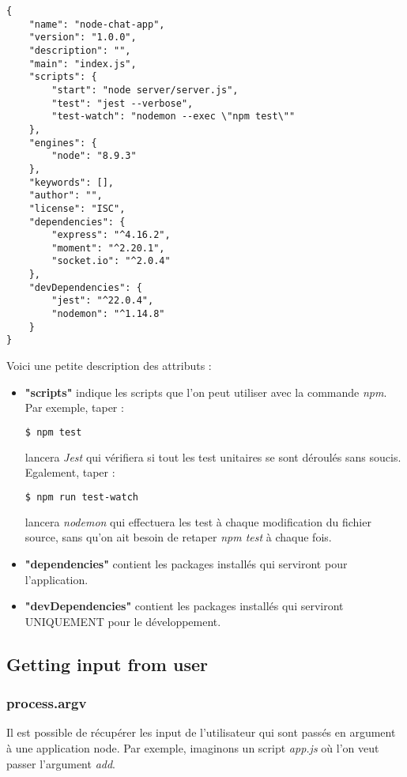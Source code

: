 \documentclass[a4paper,10pt]{article}
\begin{document}
\begin{lstlisting}[frame=single, caption={package.json}, captionpos=b]
{
    "name": "node-chat-app",
    "version": "1.0.0",
    "description": "",
    "main": "index.js",
    "scripts": {
        "start": "node server/server.js",
        "test": "jest --verbose",
        "test-watch": "nodemon --exec \"npm test\""
    },
    "engines": {
        "node": "8.9.3"
    },
    "keywords": [],
    "author": "",
    "license": "ISC",
    "dependencies": {
        "express": "^4.16.2",
        "moment": "^2.20.1",
        "socket.io": "^2.0.4"
    },
    "devDependencies": {
        "jest": "^22.0.4",
        "nodemon": "^1.14.8"
    }
} 
\end{lstlisting}
Voici une petite description des attributs :
\begin{itemize}
    \item \textbf{"scripts"} indique les scripts que l'on peut utiliser avec la commande \emph{npm}. Par exemple, taper :
    \begin{lstlisting}[language=bash, frame=single]
        $ npm test
    \end{lstlisting}
       lancera \emph{Jest} qui vérifiera si tout les test unitaires se sont déroulés sans soucis.
       Egalement, taper :
    \begin{lstlisting}[language=bash, frame=single]
        $ npm run test-watch
    \end{lstlisting}
    lancera \emph{nodemon} qui effectuera les test à chaque modification du fichier source, sans qu'on ait besoin de retaper \emph{npm test} à chaque fois.
    
    \item \textbf{"dependencies"} contient les packages installés qui serviront pour l'application.
    \item \textbf{"devDependencies"} contient les packages installés qui serviront UNIQUEMENT pour le développement.
\end{itemize}


\subsection{Getting input from user}
\subsubsection{process.argv}
Il est possible de récupérer les input de l'utilisateur qui sont passés en argument à une application node. Par exemple, imaginons un script \emph{app.js} où l'on veut passer l'argument \emph{add}.
\end{document}
